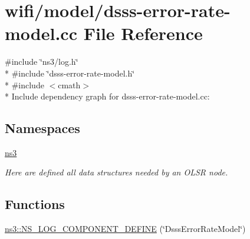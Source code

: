 \hypertarget{dsss-error-rate-model_8cc}{}\section{wifi/model/dsss-\/error-\/rate-\/model.cc File Reference}
\label{dsss-error-rate-model_8cc}
{\ttfamily \#include \char`\"{}ns3/log.\+h\char`\"{}}\\*
{\ttfamily \#include \char`\"{}dsss-\/error-\/rate-\/model.\+h\char`\"{}}\\*
{\ttfamily \#include $<$cmath$>$}\\*
Include dependency graph for dsss-\/error-\/rate-\/model.cc\+:
\subsection*{Namespaces}
\begin{DoxyCompactItemize}
\item 
 \hyperlink{namespacens3}{ns3}
\begin{DoxyCompactList}\small\item\em Here are defined all data structures needed by an O\+L\+SR node. \end{DoxyCompactList}\end{DoxyCompactItemize}
\subsection*{Functions}
\begin{DoxyCompactItemize}
\item 
\hyperlink{namespacens3_a98d920ff83f0c751821a35d33e990500}{ns3\+::\+N\+S\+\_\+\+L\+O\+G\+\_\+\+C\+O\+M\+P\+O\+N\+E\+N\+T\+\_\+\+D\+E\+F\+I\+NE} (\char`\"{}Dsss\+Error\+Rate\+Model\char`\"{})
\end{DoxyCompactItemize}
